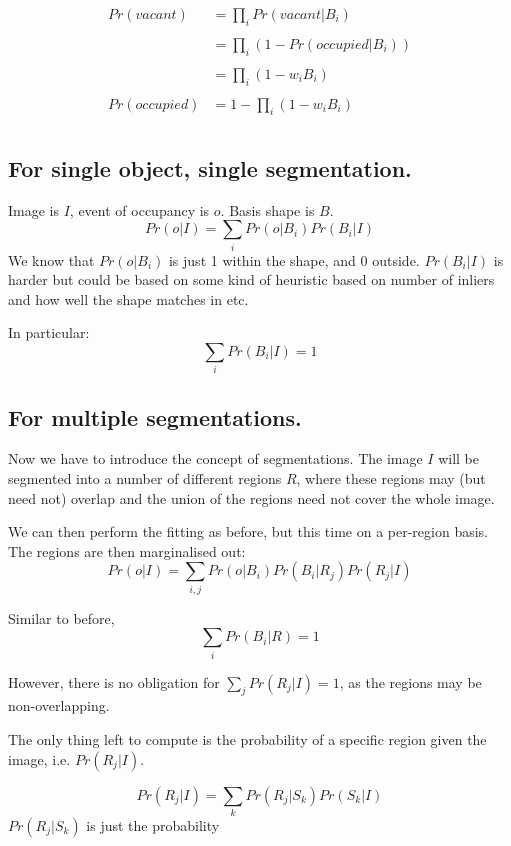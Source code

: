 \documentclass[11pt,a4paper]{article}
\author{Michael Firman}
\begin{document}
\begin{align}
Pr(vacant) &= \prod_{i} Pr(vacant | B_i )\\
&\\
 &= \prod_{i} ( 1 - Pr(occupied | B_i ) ) \\
&\\
&= \prod_{i} ( 1 - w_iB_i )  \\
&\\
Pr(occupied) &= 1 - \prod_{i} ( 1 - w_iB_i ) \\
\end{align}

\vspace{3cm}

\pagebreak
\subsection{For single object, single segmentation.}

Image is $I$, event of occupancy is $o$. Basis shape is $B$.
$$
Pr(o | I) = \sum_i Pr(o|B_i) Pr(B_i|I)
$$ 
We know that $Pr(o|B_i)$ is just 1 within the shape, and 0 outside. $Pr(B_i|I)$ is harder but could be based on some kind of heuristic based on number of inliers and how well the shape matches in etc.

In particular:
$$ 
\sum_i Pr(B_i|I) = 1
$$

\subsection{For multiple segmentations.}

Now we have to introduce the concept of segmentations. The image $I$ will be segmented into a number of different regions $R$, where these regions may (but need not) overlap and the union of the regions need not cover the whole image.

We can then perform the fitting as before, but this time on a per-region basis. The regions are then marginalised out:
$$
Pr(o | I) = \sum_{i,j} Pr(o|B_i)Pr(B_i|R_j)Pr(R_j|I)
$$

Similar to before,
$$
\sum_i Pr(B_i|R) = 1
$$

However, there is no obligation for $\sum_j Pr(R_j|I) = 1$, as the regions may be non-overlapping.

The only thing left to compute is the probability of a specific region given the image, i.e. $Pr(R_j|I)$. 

$$
Pr(R_j | I) = \sum_{k} Pr(R_j|S_k)Pr(S_k|I)
$$
$Pr(R_j|S_k)$ is just the probability 
\end{document}

